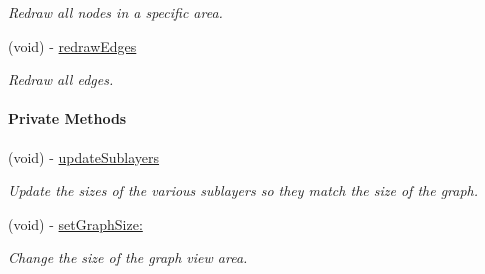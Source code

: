 \begin{Indent}
\begin{DoxyCompactItemize}
\begin{DoxyCompactList}\small\item\em Redraw all nodes in a specific area. \end{DoxyCompactList}\item 
\hypertarget{interface_p_c_graph_view_a16c9a39fa72ab568207df1a6857c7a48}{
(void) -\/ \hyperlink{interface_p_c_graph_view_a16c9a39fa72ab568207df1a6857c7a48}{redrawEdges}}
\label{interface_p_c_graph_view_a16c9a39fa72ab568207df1a6857c7a48}

\begin{DoxyCompactList}\small\item\em Redraw all edges. \end{DoxyCompactList}\end{DoxyCompactItemize}
\end{Indent}
\begin{Indent}\paragraph*{Private Methods}
\begin{DoxyCompactItemize}
\item 
\hypertarget{interface_p_c_graph_view_aadfbbac0b660ebb3a7f242563b0a4d78}{
(void) -\/ \hyperlink{interface_p_c_graph_view_aadfbbac0b660ebb3a7f242563b0a4d78}{updateSublayers}}
\label{interface_p_c_graph_view_aadfbbac0b660ebb3a7f242563b0a4d78}

\begin{DoxyCompactList}\small\item\em Update the sizes of the various sublayers so they match the size of the graph. \end{DoxyCompactList}\item 
\hypertarget{interface_p_c_graph_view_a4765f0dc9d723bd69b9467f44574722b}{
(void) -\/ \hyperlink{interface_p_c_graph_view_a4765f0dc9d723bd69b9467f44574722b}{setGraphSize:}}
\label{interface_p_c_graph_view_a4765f0dc9d723bd69b9467f44574722b}

\begin{DoxyCompactList}\small\item\em Change the size of the graph view area. \end{DoxyCompactList}\end{DoxyCompactItemize}
\end{Indent}
